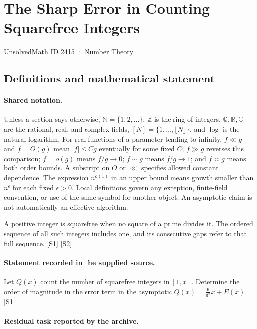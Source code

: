 \documentclass[11pt,a4paper]{article}
\newcommand{\N}{\mathbb{N}}
\newcommand{\Z}{\mathbb{Z}}
\newcommand{\Q}{\mathbb{Q}}
\newcommand{\R}{\mathbb{R}}
\newcommand{\C}{\mathbb{C}}
\newcommand{\sref}[2]{\hyperlink{source:#1:#2}{[S#2]}}
\begin{document}

\setcounter{section}{2414}

\section{The Sharp Error in Counting Squarefree Integers}\label{2415}

{\small\sffamily UnsolvedMath ID 2415 · Number Theory}

\subsection{Definitions and mathematical statement}

\paragraph{Shared notation.}Unless a section says otherwise, $\N=\{1,2,\ldots\}$,
$\Z$ is the ring of integers, $\Q,\R,\C$ are the rational, real, and complex
fields, $[N]=\{1,\ldots,\lfloor N\rfloor\}$, and $\log$ is the natural
logarithm. For real functions of a parameter tending to infinity,
$f\ll g$ and $f=O(g)$ mean $|f|\leq Cg$ eventually for some fixed $C$;
$f\gg g$ reverses this comparison; $f=o(g)$ means $f/g\to0$;
$f\sim g$ means $f/g\to1$; and $f\asymp g$ means both order bounds.
A subscript on $O$ or $\ll$ specifies allowed constant dependence.
The expression $n^{o(1)}$ in an upper bound means growth smaller than
$n^\epsilon$ for each fixed $\epsilon>0$. Local definitions govern any
exception, finite-field convention, or use of the same symbol for another
object. An asymptotic claim is not automatically an effective algorithm.



A positive integer is squarefree when no square of a prime divides it. The ordered sequence of all such integers includes one, and its consecutive gaps refer to that full sequence. \sref{2415}{1} \sref{2415}{2}

\paragraph{Statement recorded in the supplied source.}
Let $Q(x)$ count the number of squarefree integers in $[1,x]$. Determine the order of magnitude in the error term in the asymptotic $ Q(x)=\frac{6}{\pi^2}x+E(x). $ \sref{2415}{1}

\paragraph{Residual task reported by the archive.}
\end{document}

